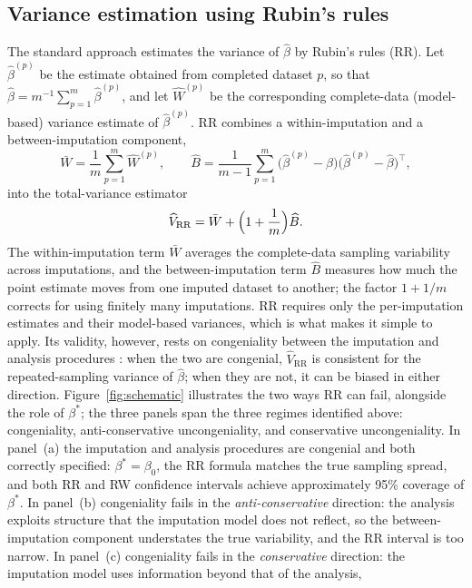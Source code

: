 \subsection{Variance estimation using Rubin's rules}\label{rubins-rules}
The standard approach estimates the variance of \(\hat\beta\) by
Rubin's rules (RR).  Let \(\hat\beta^{(p)}\) be the estimate obtained
from completed dataset \(p\), so that
\(\hat\beta=m^{-1}\sum_{p=1}^m\hat\beta^{(p)}\), and let
\(\widehat W^{(p)}\) be the corresponding complete-data (model-based)
variance estimate of \(\hat\beta^{(p)}\).  RR combines a
within-imputation and a between-imputation component,
\[
\bar W = \frac{1}{m}\sum_{p=1}^m \widehat W^{(p)},
\qquad
\widehat B
=
\frac{1}{m-1}\sum_{p=1}^m
\bigl(\hat\beta^{(p)}-\hat\beta\bigr)
\bigl(\hat\beta^{(p)}-\hat\beta\bigr)^\top,
\]
into the total-variance estimator
\[
\widehat V_{\mathrm{RR}}
=
\bar W + \Bigl(1+\frac{1}{m}\Bigr)\widehat B .
\]
The within-imputation term \(\bar W\) averages the complete-data
sampling variability across imputations, and the between-imputation
term \(\widehat B\) measures how much the point estimate moves from one
imputed dataset to another; the factor \(1+1/m\) corrects for using
finitely many imputations.
RR requires only the per-imputation estimates and their model-based
variances, which is what makes it simple to apply.  Its validity,
however, rests on congeniality between the imputation and analysis
procedures \citep{rubin1987multiple, meng1994multiple, wang1998large}:
when the two are congenial, \(\widehat V_{\mathrm{RR}}\) is consistent
for the repeated-sampling variance of \(\hat\beta\); when they are not,
it can be biased in either direction.
Figure~\ref{fig:schematic} illustrates the two ways RR can
fail, alongside the role of \(\beta^\ast\); the three panels span the
three regimes identified above: congeniality, anti-conservative
uncongeniality, and conservative uncongeniality.  In panel~(a) the
imputation and analysis procedures are congenial and both correctly
specified: \(\beta^\ast = \beta_0\), the RR formula matches the true
sampling spread, and both RR and RW confidence intervals achieve
approximately 95\% coverage of \(\beta^\ast\).  In panel~(b)
congeniality fails in the \emph{anti-conservative} direction: the
analysis exploits structure that the imputation model does not
reflect, so the between-imputation component understates the true
variability, and the RR interval is too narrow.  In panel~(c)
congeniality fails in the \emph{conservative} direction: the
imputation model uses information beyond that of the analysis,
